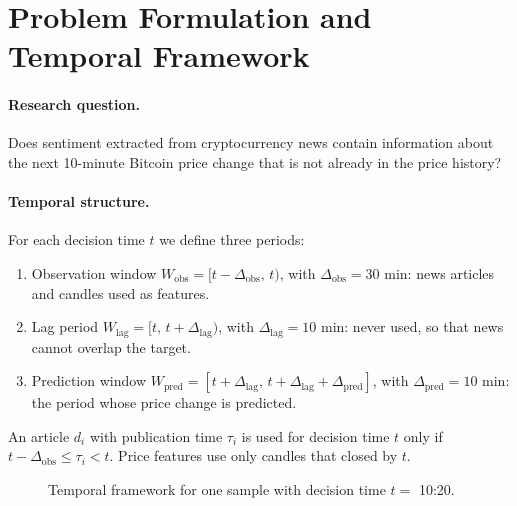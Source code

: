 \documentclass[12pt,a4paper,oneside]{report}
\newcommand{\Wobs}{W_{\mathrm{obs}}}
\newcommand{\Wlag}{W_{\mathrm{lag}}}
\newcommand{\Wpred}{W_{\mathrm{pred}}}
\newcommand{\dobs}{\Delta_{\mathrm{obs}}}
\newcommand{\dlag}{\Delta_{\mathrm{lag}}}
\newcommand{\dpred}{\Delta_{\mathrm{pred}}}
\begin{document}
\section{Problem Formulation and Temporal Framework}\label{sec:temporal}
\paragraph{Research question.} Does sentiment extracted from cryptocurrency
news contain information about the next 10-minute Bitcoin price change that
is not already in the price history?

\paragraph{Temporal structure.} For each decision time $t$ we define three
periods:
\begin{enumerate}
  \item Observation window $\Wobs = [t-\dobs,\, t)$, with $\dobs = 30$ min:
        news articles and candles used as features.
  \item Lag period $\Wlag = [t,\, t+\dlag)$, with $\dlag = 10$ min: never
        used, so that news cannot overlap the target.
  \item Prediction window $\Wpred = [t+\dlag,\, t+\dlag+\dpred]$, with
        $\dpred = 10$ min: the period whose price change is predicted.
\end{enumerate}
An article $d_i$ with publication time $\tau_i$ is used for decision time $t$
only if $t-\dobs \le \tau_i < t$. Price features use only candles that closed
by $t$.

\begin{figure}[H]
\centering
{}
\caption{Temporal framework for one sample with decision time $t=$ 10:20.}
\label{fig:timeline}
\end{figure}
\end{document}
